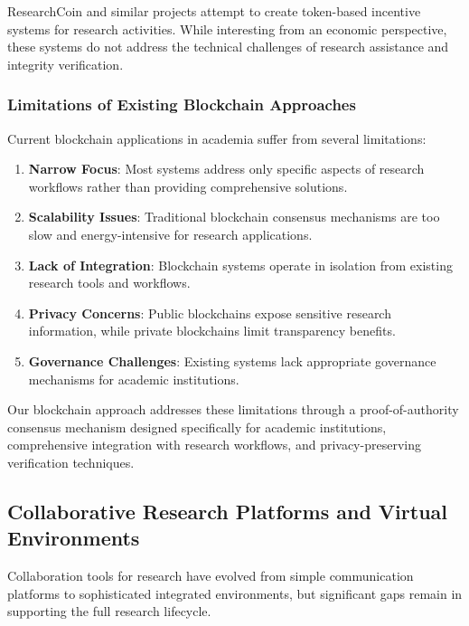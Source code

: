 \documentclass[10pt,twocolumn]{article}
\begin{document}
ResearchCoin and similar projects attempt to create token-based incentive systems for research activities. While interesting from an economic perspective, these systems do not address the technical challenges of research assistance and integrity verification.

\subsubsection{Limitations of Existing Blockchain Approaches}

Current blockchain applications in academia suffer from several limitations:

\begin{enumerate}
    \item \textbf{Narrow Focus}: Most systems address only specific aspects of research workflows rather than providing comprehensive solutions.
    
    \item \textbf{Scalability Issues}: Traditional blockchain consensus mechanisms are too slow and energy-intensive for research applications.
    
    \item \textbf{Lack of Integration}: Blockchain systems operate in isolation from existing research tools and workflows.
    
    \item \textbf{Privacy Concerns}: Public blockchains expose sensitive research information, while private blockchains limit transparency benefits.
    
    \item \textbf{Governance Challenges}: Existing systems lack appropriate governance mechanisms for academic institutions.
\end{enumerate}

Our blockchain approach addresses these limitations through a proof-of-authority consensus mechanism designed specifically for academic institutions, comprehensive integration with research workflows, and privacy-preserving verification techniques.

\subsection{Collaborative Research Platforms and Virtual Environments}

Collaboration tools for research have evolved from simple communication platforms to sophisticated integrated environments, but significant gaps remain in supporting the full research lifecycle.
\end{document}
